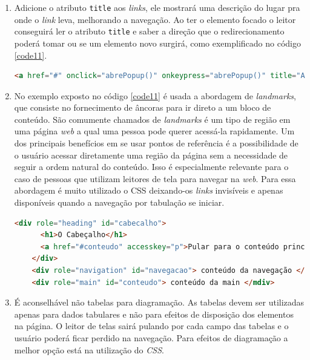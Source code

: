 {{\begin{enumerate}
    \item Adicione o atributo \lstinline{title} aos \textit{links}, ele mostrará uma descrição do lugar pra onde o \textit{link} leva, melhorando a navegação. Ao ter o elemento focado o leitor conseguirá ler o atributo \lstinline{title} e saber a direção que o redirecionamento poderá tomar ou se um elemento novo surgirá, como exemplificado no código \ref{code11}.
    {\begin{lstlisting}[language=html,caption={Uso do atributo \textit{title} para dar uma explicação sobre onde o link leva}, label=code11]
    <a href="#" onclick="abrePopup()" onkeypress="abrePopup()" title="Abre uma janela pop-up com Javascript">Ver mais informações</a>
    \end{lstlisting}}
    
    \item No exemplo exposto no código \ref{code11} é usada a abordagem de \textit{landmarks}, que consiste no  fornecimento de âncoras para ir direto a um bloco de conteúdo. São comumente chamados de \textit{landmarks} é um tipo de região em uma página \textit{web} a qual uma pessoa pode querer acessá-la rapidamente. Um dos principais benefícios em se usar pontos de referência é a possibilidade de o usuário acessar diretamente uma região da página sem a necessidade de seguir a ordem natural do conteúdo. Isso é especialmente relevante para o caso de pessoas que utilizam leitores de tela para navegar na \textit{web}. Para essa abordagem é muito utilizado o CSS \cite{CSS} deixando-os \textit{links} invisíveis e apenas disponíveis quando a navegação por tabulação se iniciar.
    
    {\begin{lstlisting}[language=html,caption={Criação de \textit{landmarks} para acessar pontos de referências através do atalho p.}, label=code12]
    <div role="heading" id="cabecalho"> 
      <h1>O Cabeçalho</h1> 
      <a href="#conteudo" accesskey="p">Pular para o conteúdo principals</a> 
    </div> 
    <div role="navigation" id="navegacao"> conteúdo da navegação </div>
    <div role="main" id="conteudo"> conteúdo da main </mdiv>
    \end{lstlisting}}
    
    \item É aconselhável não tabelas para diagramação. As tabelas devem ser utilizadas apenas para dados tabulares e não para efeitos de disposição dos elementos na página. O leitor de telas sairá pulando por cada campo das tabelas e o usuário poderá ficar perdido na navegação. Para efeitos de diagramação a melhor opção está na utilização do \textit{CSS}.
    

\end{enumerate}}}
